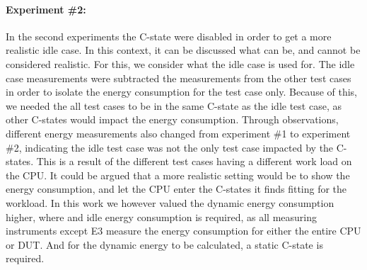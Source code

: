 \paragraph*{Experiment \#2:} In the second experiments the C-state were disabled in order to get a more realistic idle case. In this context, it can be discussed what can be, and cannot be considered realistic. For this, we consider what the idle case is used for. The idle case measurements were subtracted the measurements from the other test cases in order to isolate the energy consumption for the test case only. Because of this, we needed the all test cases to be in the same C-state as the idle test case, as other C-states would impact the energy consumption. Through observations, different energy measurements also changed from experiment \#1 to experiment \#2, indicating the idle test case was not the only test case impacted by the C-states. This is a result of the different test cases having a different work load on the CPU. It could be argued that a more realistic setting would be to show the energy consumption, and let the CPU enter the C-states it finds fitting for the workload. In this work we however valued the dynamic energy consumption higher, where and idle energy consumption is required, as all measuring instruments except E3 measure the energy consumption for either the entire CPU or DUT. And for the dynamic energy to be calculated, a static C-state is required.


